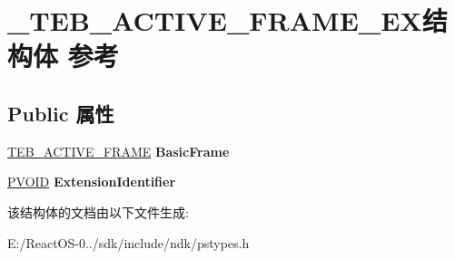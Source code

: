 \hypertarget{struct___t_e_b___a_c_t_i_v_e___f_r_a_m_e___e_x}{}\section{\+\_\+\+T\+E\+B\+\_\+\+A\+C\+T\+I\+V\+E\+\_\+\+F\+R\+A\+M\+E\+\_\+\+E\+X结构体 参考}
\label{struct___t_e_b___a_c_t_i_v_e___f_r_a_m_e___e_x}
\subsection*{Public 属性}
\begin{DoxyCompactItemize}
\item 
\mbox{\label{struct___t_e_b___a_c_t_i_v_e___f_r_a_m_e___e_x_a3fcd18233946e3ff22dfba8c02032e7a}} 
\hyperlink{struct___t_e_b___a_c_t_i_v_e___f_r_a_m_e}{T\+E\+B\+\_\+\+A\+C\+T\+I\+V\+E\+\_\+\+F\+R\+A\+ME} {\bfseries Basic\+Frame}
\item 
\mbox{\label{struct___t_e_b___a_c_t_i_v_e___f_r_a_m_e___e_x_af957c14e8adea3d7e3a630d9ada1fcbc}} 
\hyperlink{interfacevoid}{P\+V\+O\+ID} {\bfseries Extension\+Identifier}
\end{DoxyCompactItemize}


该结构体的文档由以下文件生成\+:\begin{DoxyCompactItemize}
\item 
E\+:/\+React\+O\+S-\/0../sdk/include/ndk/pstypes.\+h\end{DoxyCompactItemize}

